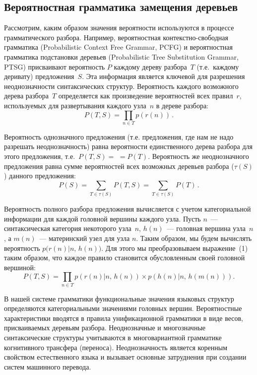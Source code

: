 \begin{multicols}{2}
\subsection{Вероятностная грамматика замещения деревьев}

Рассмотрим, каким образом значения вероятности используются в процессе 
грамматического разбора. Например, вероятностная контекстно-свободная 
грамматика (Probabilistic Context Free Grammar, PCFG) и вероятностная 
грамматика подстановки деревьев  (Probabilistic Tree Substitution Grammar, 
PTSG) присваивают вероятность $P$ каж\-до\-му дереву разбора~$T$ (т.е.\ каждому 
деривату) предложения~$S$. Эта информация является ключевой для разрешения 
неоднозначности синтаксических структур. Вероятность каждого возможного дерева 
разбора~$T$ определяется как произведение вероятностей всех правил~$r$, 
используемых для развертывания каждого узла~$n$ в дереве разбора: 
$$ 
P(T,S) = \prod\limits_{n\in T} p(r(n))\,.
$$

Вероятность однозначного предложения (т.е. предложения, где нам не
надо разрешать неоднозначность) равна  вероятности единственного дерева
разбора для этого предложения, т.е.\ $P(T,S)=$\linebreak
$=P(T)$. Вероятность же
неоднозначного предложения равна сумме вероятностей всех возможных
деревьев разбора ($\tau (S)$) данного предложения:
    $$
P(S) = \sum\limits_{T\in \tau (S)} P(T,S) = \sum\limits_{T\in\tau (S)} P(T)\,.
$$

Вероятность полного разбора предложения вычисляется с учетом категориальной 
информации для каждой головной вершины каждого узла. Пусть $n$~--- 
синтаксическая категория некоторого узла~$n$, $h(n)$~--- головная вершина 
узла~$n$, а $m(n)$~--- материнский узел для узла $n$. Таким образом, мы будем 
вычислять вероятность  $p(r(n)\vert n$, $h(n))$. Для этого мы преобразовываем 
выражение~(1) таким образом, что каждое правило становится обу\-слов\-лен\-ным 
своей головной вершиной:
$$
P(T,S) = \prod\limits_{n\in T} p(r(n)\vert n,\, h(n))\times p(h(n)\vert
n,\,h(m(n))).
$$

В нашей системе грамматики функциональные значения языковых
структур определяются категориальными значениями головных вершин.
Вероятностные характеристики вводятся в правила унификационной
грамматики в виде весов, присваиваемых деревьям разбора. Неоднозначные
и многозначные синтаксические структуры учитываются в многовариантной
грамматике когнитивного трансфера (переноса). Неоднозначность является
коренным свойством естественного языка и вызывает основные затруднения
при создании систем машинного перевода.


\end{multicols}
